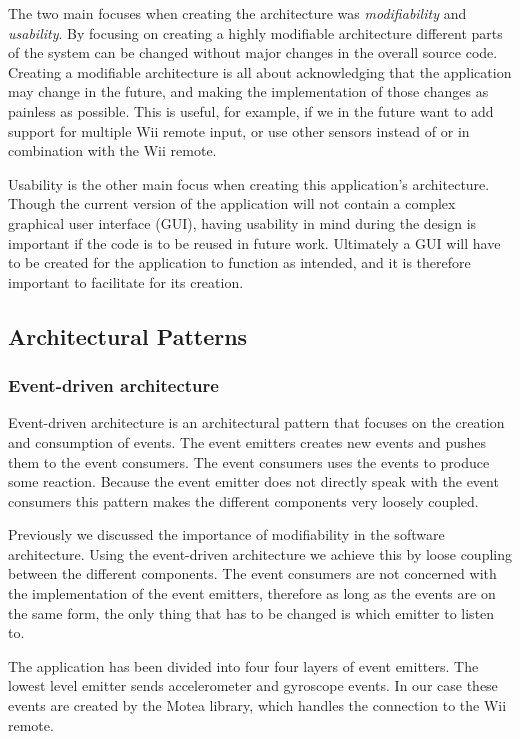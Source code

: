 The two main focuses when creating the architecture was \emph{modifiability} and \emph{usability}. By focusing on creating a highly modifiable architecture different parts of the system can be changed without major changes in the overall source code. Creating a modifiable architecture is all about acknowledging that the application may change in the future, and  making the implementation of those changes as painless as possible. This is useful, for example, if we in the future want to add support for multiple Wii remote input, or use other sensors instead of or in combination with the Wii remote.

Usability is the other main focus when creating this application’s architecture. Though the current version of the application will not contain a complex graphical user interface (GUI), having usability in mind during the design is important if the code is to be reused in future work. Ultimately a GUI will have to be created for the application to function as intended, and it is therefore important to facilitate for its creation.

\subsection{Architectural Patterns}
\subsubsection{Event-driven architecture}
Event-driven architecture is an architectural pattern that focuses on the creation and consumption of events. The event emitters creates new events and pushes them to the event consumers. The event consumers uses the events to produce some reaction. Because the event emitter does not directly speak with the event consumers this pattern makes the different components very loosely coupled.

Previously we discussed the importance of modifiability in the software architecture. Using the event-driven architecture we achieve this by loose coupling between the different components. The event consumers are not concerned with the implementation of the event emitters, therefore as long as the events are on the same form, the only thing that has to be changed is which emitter to listen to. 

The application has been divided into four four layers of event emitters. The lowest level emitter sends accelerometer and gyroscope events. In our case these events are created by the Motea library, which handles the connection to the Wii remote. 

